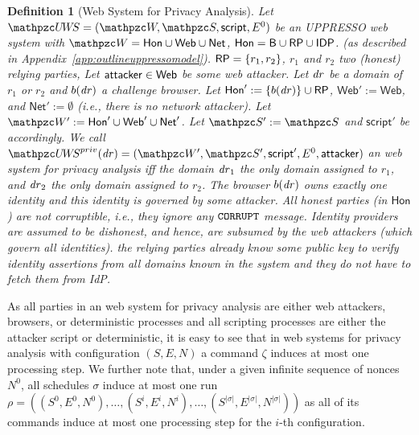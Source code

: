 \documentclass[letterpaper,onecolumn,10pt]{article}
\newtheorem{definition}{Definition}
\begin{document}
\begin{definition}[\uppresso Web System for Privacy Analysis]\label{def:uppresso-ws-priv}
  Let $\uppressowebsystem = (\bidsystem, \scriptset, 
  \mathsf{script}, E^0)$ be an UPPRESSO web system with 
  $\bidsystem = \mathsf{Hon} \cup \mathsf{Web} \cup \mathsf{Net}$, 
  $\mathsf{Hon} = \mathsf{B} \cup \mathsf{RP} \cup \mathsf{IDP}$.
  (as described in Appendix~\ref{app:outlineuppressomodel}).
  $\mathsf{RP} = \{r_1,r_2\}$, $r_1$ and $r_2$ two (honest) relying parties,
  Let $\mathsf{attacker} \in \mathsf{Web}$ be some web attacker.
  Let $\mathit{dr}$ be a domain of $r_1$ or $r_2$ and $b(\mathit{dr})$ a challenge browser. 
  Let $\mathsf{Hon}' := \{ b(\mathit{dr}) \} \cup \mathsf{RP}$, 
  $\mathsf{Web}' := \mathsf{Web}$, 
  and $\mathsf{Net}' := \emptyset$ (i.e., there is no network attacker).
  Let $\bidsystem' := \mathsf{Hon}' \cup \mathsf{Web}' \cup \mathsf{Net}'$.  
  Let $\scriptset' := \scriptset$ and $\mathsf{script}'$ be accordingly.
  We call $\uppressoprivwebsystem(\mi{dr}) = (\bidsystem', \scriptset', \mathsf{script}', E^0, \fAP{attacker})$ 
  an \emph{\uppresso web system for privacy analysis} 
  iff the domain $\mathit{dr}_1$ the only domain assigned to $r_1$, and
  $\mathit{dr}_2$ the only domain assigned to $r_2$. The browser
  $b(\mathit{dr})$ owns exactly one identity and this identity
  is governed by some attacker.  All honest parties (in
  $\mathsf{Hon}$) are not corruptible, i.e., they ignore any
  $\mathtt{CORRUPT}$ message. Identity providers are assumed to be
  dishonest, and hence, are subsumed by the web attackers (which
  govern all identities). %
  the relying
  parties already know some public key to verify \uppresso identity
  assertions from all domains known in the system and they do not have to fetch them from IdP.
\end{definition}

As all parties in an \uppresso web system for privacy analysis are either web 
attackers, browsers, or deterministic processes and all scripting processes are 
either the attacker script or deterministic, it is easy to see that in \uppresso 
web systems for privacy analysis with configuration $(S,E,N)$ a command $\zeta$ 
induces at most one processing step. We further note that, under a given infinite 
sequence of nonces $N^0$, all schedules $\sigma$ induce at most one run 
$\rho = ((S^0,E^0,N^0),\dots,(S^i,E^i,N^i),\dots,(S^{|\sigma|},E^{|\sigma|},N^{|\sigma|}))$ 
as all of its commands induce at most one processing step for the $i$-th configuration.
\end{document}
